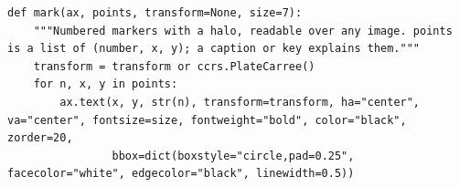 \begin{lstlisting}[firstnumber=102]
def mark(ax, points, transform=None, size=7):
    """Numbered markers with a halo, readable over any image. points is a list of (number, x, y); a caption or key explains them."""
    transform = transform or ccrs.PlateCarree()
    for n, x, y in points:
        ax.text(x, y, str(n), transform=transform, ha="center", va="center", fontsize=size, fontweight="bold", color="black", zorder=20,
                bbox=dict(boxstyle="circle,pad=0.25", facecolor="white", edgecolor="black", linewidth=0.5))
\end{lstlisting}

